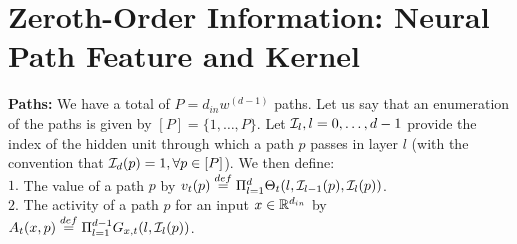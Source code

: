 \section{Zeroth-Order Information: Neural Path Feature and Kernel}
\textbf{Paths:} We have a total of $P=d_{in}w^{(d-1)}$ paths. Let us say that an enumeration of the paths is given by $[P]=\{1,\ldots,P\}$. Let $\mathcal{I}_{l},l=0,\ldots,d-1$ provide the index of the hidden unit through which a path $p$ passes in layer $l$ (with the convention that $\mathcal{I}_d(p)=1,\forall p\in [P]$). We then define:\\
$1.$ The value of a path $p$ by $v_t(p)\stackrel{def}=\Pi_{l=1}^d \Theta_t(l,\mathcal{I}_{l-1}(p),\mathcal{I}_l(p))$.\\
$2.$ The activity of a path $p$ for an input $x\in \mathbb{R}^{d_{in}}$ by $A_{t}(x,p)\stackrel{def}{=}\Pi_{l=1}^{d-1} G_{x,t}(l,\mathcal{I}_l(p))$.\\
\begin{comment}
\FloatBarrier
\begin{table}[h]
\begin{minipage}{0.5\columnwidth}
\resizebox{\columnwidth}{!}{
\begin{tabular}{|c|l|}\hline								 								 													
NPF		&$\phi_{x,t}=(x(\I_0(p))A_t(x,p) ,p\in[P])\in \R^P$\\\hline	
OASN	&$\lambda_t(x,x')=\sum_{p\rsa i} A_t(x,p) A_t(x',p)$\\\hline
NPK		&$H_t(x,x')=\ip{\phi_{x,t},\phi_{x',t}}$\\\hline		
VTP		&$\varphi^v_{p,t}=(\partial_{\theta}v_t(p),\theta\in\Theta)\inrdnet$ \\\hline	
VG		&$\psi^v_{x,t}=\nabla_{\Theta} \hat{y}_t(x)\in\R^{d_{net}}$\\\hline
\end{tabular}
}
\end{minipage}
\begin{minipage}{0.5\columnwidth}
\resizebox{\columnwidth}{!}{
\begin{tabular}{|c|l|}\hline								 								 													
ATP		&$\varphi^a_{x,p,t}=(\partial_{\tg}A_t(x,p),\tg\in\Tg)\inrdnet$ \\\hline	
FG		&$\psi^{\phi}_{x,t}=\nabla_{\Tg} \hat{y}_t(x)\in\R^{d_{net}}$\\\hline
OSSN 	&$\delta_t(x,x')=\sum_{p\rsa i} \ip{\varphi^a_{x,p,t},\varphi^a_{x',p,t}}$\\\hline
NTF		&$\psi_{x,t}=(\psi^v_{x,t},\psi^{\phi}_{x,t})\in\R^{2d_{net}}$\\\hline
NTK 		&$K_t(x,x')=\ip{\psi_{x,t}\psi_{x',t}}$\\\hline
\end{tabular}
}
\end{minipage}
\caption{Shows all zeroth-order and first-order quantities related to information flow in a DGN.}
\label{tb:terms}
\end{table}
\end{comment}
